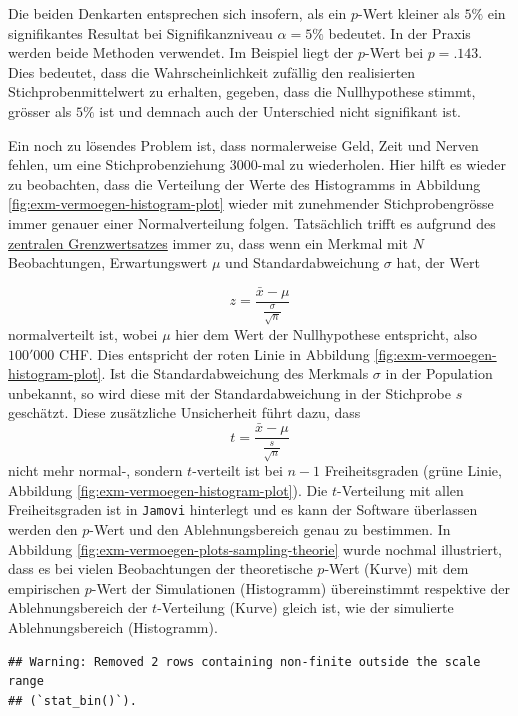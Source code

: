 \documentclass[
]{book}
\theoremstyle{definition}
\theoremstyle{definition}
\theoremstyle{definition}
\theoremstyle{definition}
\theoremstyle{remark}
\begin{document}
Die beiden Denkarten entsprechen sich insofern, als ein \(p\)-Wert kleiner als \(5\%\) ein signifikantes Resultat bei Signifikanzniveau \(\alpha = 5\%\) bedeutet. In der Praxis werden beide Methoden verwendet. Im Beispiel liegt der \(p\)-Wert bei \(p = .143\). Dies bedeutet, dass die Wahrscheinlichkeit zufällig den realisierten Stichprobenmittelwert zu erhalten, gegeben, dass die Nullhypothese stimmt, grösser als \(5\%\) ist und demnach auch der Unterschied nicht signifikant ist.

Ein noch zu lösendes Problem ist, dass normalerweise Geld, Zeit und Nerven fehlen, um eine Stichprobenziehung \(3000\)-mal zu wiederholen. Hier hilft es wieder zu beobachten, dass die Verteilung der Werte des Histogramms in Abbildung \ref{fig:exm-vermoegen-histogram-plot} wieder mit zunehmender Stichprobengrösse immer genauer einer Normalverteilung folgen. Tatsächlich trifft es aufgrund des \hyperref[customdef-zentraler-grenzwertsatz]{zentralen Grenzwertsatzes} immer zu, dass wenn ein Merkmal mit \(N\) Beobachtungen, Erwartungswert \(\mu\) und Standardabweichung \(\sigma\) hat, der Wert

\[z = \frac{\bar{x}-\mu}{\frac{\sigma}{\sqrt{n}}}\]
normalverteilt ist, wobei \(\mu\) hier dem Wert der Nullhypothese entspricht, also \(100'000\) CHF. Dies entspricht der roten Linie in Abbildung \ref{fig:exm-vermoegen-histogram-plot}. Ist die Standardabweichung des Merkmals \(\sigma\) in der Population unbekannt, so wird diese mit der Standardabweichung in der Stichprobe \(s\) geschätzt. Diese zusätzliche Unsicherheit führt dazu, dass
\begin{equation}
t = \frac{\bar{x}-\mu}{\frac{s}{\sqrt{n}}}
\label{eq:t-emp-onesample}
\end{equation}
nicht mehr normal-, sondern \(t\)-verteilt ist bei \(n-1\) Freiheitsgraden (grüne Linie, Abbildung \ref{fig:exm-vermoegen-histogram-plot}). Die \(t\)-Verteilung mit allen Freiheitsgraden ist in \texttt{Jamovi} hinterlegt und es kann der Software überlassen werden den \(p\)-Wert und den Ablehnungsbereich genau zu bestimmen. In Abbildung \ref{fig:exm-vermoegen-plots-sampling-theorie} wurde nochmal illustriert, dass es bei vielen Beobachtungen der theoretische \(p\)-Wert (Kurve) mit dem empirischen \(p\)-Wert der Simulationen (Histogramm) übereinstimmt respektive der Ablehnungsbereich der \(t\)-Verteilung (Kurve) gleich ist, wie der simulierte Ablehnungsbereich (Histogramm).

\begin{verbatim}
## Warning: Removed 2 rows containing non-finite outside the scale range
## (`stat_bin()`).
\end{verbatim}
\end{document}
